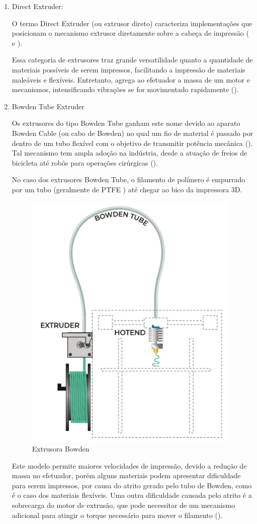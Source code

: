 \documentclass[12pt, english]{article}
\begin{document}
\begin{enumerate}
	\item {
		Direct Extruder:
		
		O termo Direct Extruder (ou extrusor direto) caracteriza implementações que posicionam o mecanismo extrusor diretamente sobre a cabeça de impressão (\cite{FILAMENT2PRINT} e \cite{RECREUS}). 


		
		Essa categoria de extrusores traz grande versatilidade quanto a quantidade de materiais possíveis de serem impressos, facilitando a impressão de materiais maleáveis e flexíveis. Entretanto, agrega ao efetuador a massa de um motor e mecanismos, intensificando vibrações se for movimentado rapidamente (\cite{ALL3DP:3DPrinterExtruder}).
		
	}
	\item {
		Bowden Tube Extruder

		Os extrusores do tipo Bowden Tube ganham este nome devido ao aparato Bowden Cable (ou cabo de Bowden) no qual um fio de material é passado por dentro de um tubo flexível com o objetivo de transmitir potência mecânica (\cite{Letier2006}). Tal mecanismo tem ampla adoção na indústria, desde a atuação de freios de bicicleta até robôs para operações cirúrgicas (\cite{Jeong2015}). 

		No caso dos extrusores Bowden Tube, o filamento de polímero é empurrado por um tubo (geralmente de PTFE \cite{PTFE}) até chegar ao bico da impressora 3D. 
		
		\begin{figure}[H]
			\centering
			\includegraphics[height=.4\linewidth]{Bowden-extruder.png}
			\caption{Extrusora Bowden}
		\end{figure} 
		
		Este modelo permite maiores velocidades de impressão, devido a redução de massa no efetuador, porém alguns materiais podem apresentar dificuldade para serem impressos, por causa do atrito gerado pelo tubo de Bowden, como é o caso dos materiais flexíveis. Uma outra dificuldade causada pelo atrito é a sobrecarga do motor de extrusão, que pode necessitar de um mecanismo adicional para atingir o torque necessário para mover o filamento (\cite{ALL3DP:3DPrinterExtruder}).

	}	
\end{enumerate}	
\end{document}
